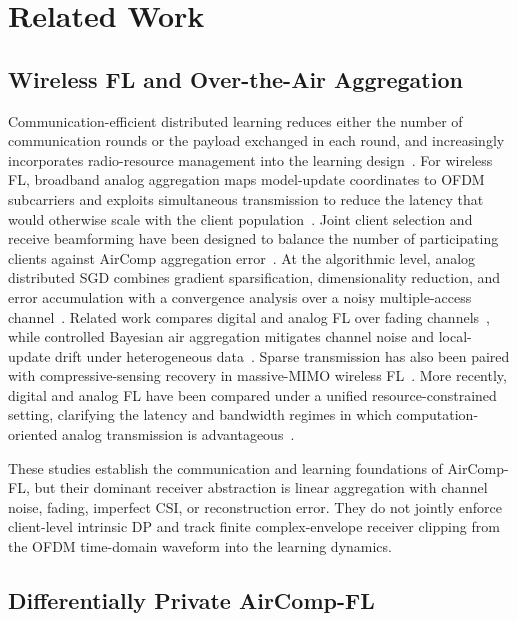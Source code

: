 \documentclass[journal]{IEEEtran}
\begin{document}
\section{Related Work}
\label{sec:related_work}

\subsection{Wireless FL and Over-the-Air Aggregation}

Communication-efficient distributed learning reduces either the number of communication rounds or the payload exchanged in each round, and increasingly incorporates radio-resource management into the learning design~\cite{cao2023overview}. For wireless FL, broadband analog aggregation maps model-update coordinates to OFDM subcarriers and exploits simultaneous transmission to reduce the latency that would otherwise scale with the client population~\cite{zhu2019broadband}. Joint client selection and receive beamforming have been designed to balance the number of participating clients against AirComp aggregation error~\cite{yang2020federated}. At the algorithmic level, analog distributed SGD combines gradient sparsification, dimensionality reduction, and error accumulation with a convergence analysis over a noisy multiple-access channel~\cite{amiri2020machine}. Related work compares digital and analog FL over fading channels~\cite{amiri2020fading}, while controlled Bayesian air aggregation mitigates channel noise and local-update drift under heterogeneous data~\cite{gafni2024controlled}. Sparse transmission has also been paired with compressive-sensing recovery in massive-MIMO wireless FL~\cite{jeon2021compressive}. More recently, digital and analog FL have been compared under a unified resource-constrained setting, clarifying the latency and bandwidth regimes in which computation-oriented analog transmission is advantageous~\cite{yao2024wireless}.

These studies establish the communication and learning foundations of AirComp-FL, but their dominant receiver abstraction is linear aggregation with channel noise, fading, imperfect CSI, or reconstruction error. They do not jointly enforce client-level intrinsic DP and track finite complex-envelope receiver clipping from the OFDM time-domain waveform into the learning dynamics.

\subsection{Differentially Private AirComp-FL}
\end{document}
